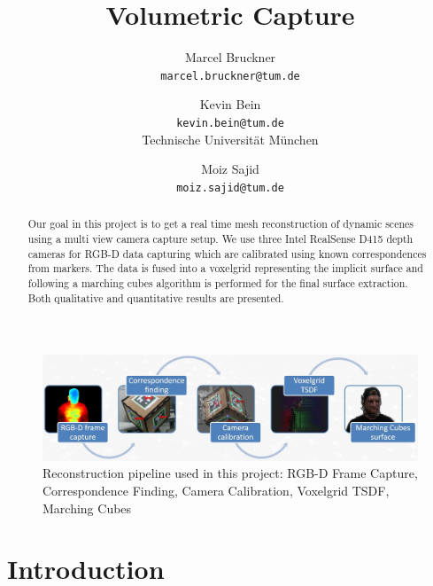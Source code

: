 \documentclass[10pt,twocolumn,letterpaper]{article}
\begin{document}
\title{Volumetric Capture}

\author{Marcel Bruckner\\
{\tt\small marcel.bruckner@tum.de}
\and
Kevin Bein\\
{\tt\small kevin.bein@tum.de}\\[0.5em]
Technische Universit\"at M\"unchen
\and
Moiz Sajid\\
{\tt\small moiz.sajid@tum.de}
}

\maketitle

\newcommand{\intel}{Intel\textsuperscript{\textcopyright}}
\newcommand{\fref}[1]{\mbox{Figure~\ref{#1}}}
\newcommand{\rscamera}{\intel{} RealSense\texttrademark{} Depth Camera~D415 \cite{DepthCameraD415}}

\begin{abstract}
   Our goal in this project is to get a real time mesh reconstruction of dynamic scenes using a multi view camera capture setup. We use three Intel RealSense D415 depth cameras for RGB-D data capturing which are calibrated using known correspondences from markers. The data is fused into a voxelgrid representing the implicit surface and following a marching cubes algorithm is performed for the final surface extraction. Both qualitative and quantitative results are presented.   
\end{abstract}


\begin{figure}[t]
	\begin{center}
		\includegraphics[width=1.0\linewidth]{imgs/pipeline}
	\end{center}
	\caption{Reconstruction pipeline used in this project: RGB-D Frame Capture, Correspondence Finding, Camera Calibration, Voxelgrid TSDF, Marching Cubes}
	\label{fig:reconstruction-pipeline}
\end{figure}

\section{Introduction}
\end{document}
